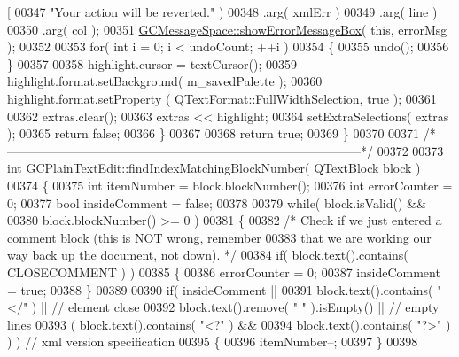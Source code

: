 \begin{DoxyCode}
{       [%
00347                                 \textcolor{stringliteral}{"Your action will be reverted."} )
00348                        .arg( xmlErr )
00349                        .arg( line )
00350                        .arg( col );
00351     \hyperlink{namespace_g_c_message_space_ab118b3a133686167617eb955029fd44e}{GCMessageSpace::showErrorMessageBox}( \textcolor{keyword}{this}, errorMsg );
00352 
00353     \textcolor{keywordflow}{for}( \textcolor{keywordtype}{int} i = 0; i < undoCount; ++i )
00354     \{
00355       undo();
00356     \}
00357 
00358     highlight.cursor = textCursor();
00359     highlight.format.setBackground( m\_savedPalette );
00360     highlight.format.setProperty  ( QTextFormat::FullWidthSelection, \textcolor{keyword}{true} );
00361 
00362     extras.clear();
00363     extras << highlight;
00364     setExtraSelections( extras );
00365     \textcolor{keywordflow}{return} \textcolor{keyword}{false};
00366   \}
00367 
00368   \textcolor{keywordflow}{return} \textcolor{keyword}{true};
00369 \}
00370 
00371 \textcolor{comment}{/*
      --------------------------------------------------------------------------------------*/}
00372 
00373 \textcolor{keywordtype}{int} GCPlainTextEdit::findIndexMatchingBlockNumber( QTextBlock block )
00374 \{
00375   \textcolor{keywordtype}{int} itemNumber = block.blockNumber();
00376   \textcolor{keywordtype}{int} errorCounter = 0;
00377   \textcolor{keywordtype}{bool} insideComment = \textcolor{keyword}{false};
00378 
00379   \textcolor{keywordflow}{while}( block.isValid() &&
00380          block.blockNumber() >= 0 )
00381   \{
00382     \textcolor{comment}{/* Check if we just entered a comment block (this is NOT wrong, remember}
00383 \textcolor{comment}{      that we are working our way back up the document, not down). */}
00384     \textcolor{keywordflow}{if}( block.text().contains( CLOSECOMMENT ) )
00385     \{
00386       errorCounter = 0;
00387       insideComment = \textcolor{keyword}{true};
00388     \}
00389 
00390     \textcolor{keywordflow}{if}( insideComment ||
00391         block.text().contains( \textcolor{stringliteral}{"</"} ) ||          \textcolor{comment}{// element close}
00392         block.text().remove( \textcolor{stringliteral}{" "} ).isEmpty() ||   \textcolor{comment}{// empty lines}
00393         ( block.text().contains( \textcolor{stringliteral}{"<?"} ) &&
00394           block.text().contains( \textcolor{stringliteral}{"?>"} ) ) )       \textcolor{comment}{// xml version specification}
00395     \{
00396       itemNumber--;
00397     \}
00398 
}
\end{DoxyCode}
